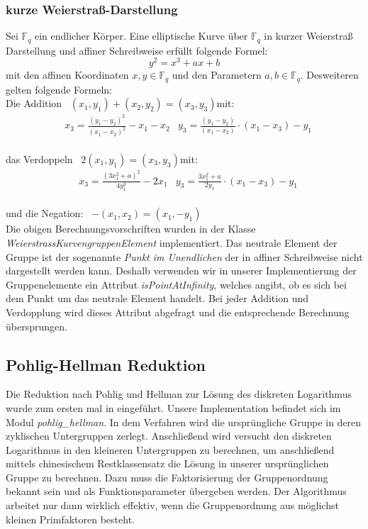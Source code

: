\documentclass{scrartcl}
\begin{document}
\subsubsection{kurze Weierstraß-Darstellung}
\label{sec:weierstrass_kurven}
Sei $\mathbb{F}_q$ ein endlicher Körper.
Eine elliptische Kurve über $\mathbb{F}_q$ in kurzer Weierstraß Darstellung und affiner Schreibweise erfüllt folgende Formel:
$$ y^2 = x^3 + ax +b$$
mit den affinen Koordinaten $x,y \in \mathbb{F}_q$ und den Parametern $a, b \in \mathbb{F}_q$.
Desweiteren gelten folgende Formeln: \vspace{5pt}\\
Die Addition \ $(x_1,y_1)+(x_2,y_2)=(x_3,y_3)$\quad mit: \\
\begin{align*}
  &x_3=\frac{(y_1-y_2)^2}{(x_1-x_2)^2}-x_1-x_2
  &y_3=\frac{(y_1-y_2)}{(x_1-x_2)}\cdot (x_1 - x_3) - y_1
\end{align*}\\
das Verdoppeln \ $ 2(x_1,y_1)=(x_3,y_3) $\quad mit: \\
\begin{align*} 
  &x_3=\frac{(3x_1^2+a)^2}{4y_1^2}-2x_1
  &y_3= \frac{3x_1^2+a}{2y_1} \cdot (x_1 - x_3) - y_1
\end{align*}\\
und die Negation: \ $-(x_1,x_2)=(x_1,-y_1) $ \vspace{5pt} \\
Die obigen Berechnungsvorschriften wurden in der Klasse \emph{WeierstrassKurvengruppenElement} implementiert. Das neutrale Element der Gruppe ist der sogenannte \emph{Punkt im Unendlichen} der in affiner Schreibweise nicht dargestellt werden kann. Deshalb verwenden wir in unserer Implementierung der Gruppenelemente ein Attribut {\emph{isPointAtInfinity}}, welches angibt, ob es sich bei dem Punkt um das neutrale Element handelt. Bei jeder Addition und Verdopplung wird dieses Attribut abgefragt und die entsprechende Berechnung übersprungen.
\subsection{Pohlig-Hellman Reduktion}
\label{sec:pohlig_hellman}
Die Reduktion nach Pohlig und Hellman zur Lösung des diskreten Logarithmus wurde zum ersten mal in \cite{Pohlig1978} eingeführt. Unsere Implementation befindet sich im Modul \emph{pohlig\_hellman}. In dem Verfahren wird die ursprüngliche Gruppe in deren zyklischen Untergruppen zerlegt. Anschließend wird versucht den diskreten Logarithmus in den kleineren Untergruppen zu berechnen, um anschließend mittels chinesischem Restklassensatz die Lösung in unserer ursprünglichen Gruppe zu berechnen. Dazu muss die Faktorisierung der Gruppenordnung bekannt sein und als Funktionsparameter übergeben werden. Der Algorithmus arbeitet nur dann wirklich effektiv, wenn die Gruppenordnung aus möglichst kleinen Primfaktoren besteht.
\end{document}
